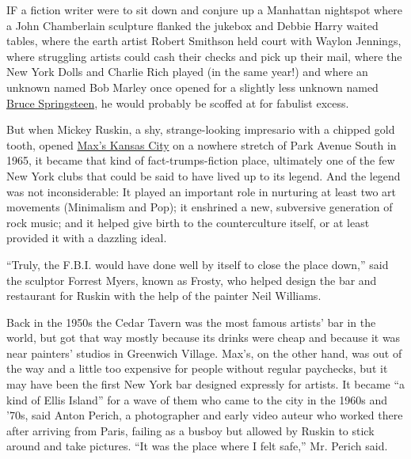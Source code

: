 IF a fiction writer were to sit down and conjure up a Manhattan
nightspot where a John Chamberlain sculpture flanked the jukebox and
Debbie Harry waited tables, where the earth artist Robert Smithson held
court with Waylon Jennings, where struggling artists could cash their
checks and pick up their mail, where the New York Dolls and Charlie Rich
played (in the same year!) and where an unknown named Bob Marley once
opened for a slightly less unknown named
\href{http://www.youtube.com/watch?v=xOQfo3406XE}{Bruce Springsteen}, he
would probably be scoffed at for fabulist excess.

But when Mickey Ruskin, a shy, strange-looking impresario with a chipped
gold tooth, opened
\href{http://classic.maxskansascity.com/index2.php}{Max's Kansas City}
on a nowhere stretch of Park Avenue South in 1965, it became that kind
of fact-trumps-fiction place, ultimately one of the few New York clubs
that could be said to have lived up to its legend. And the legend was
not inconsiderable: It played an important role in nurturing at least
two art movements (Minimalism and Pop); it enshrined a new, subversive
generation of rock music; and it helped give birth to the counterculture
itself, or at least provided it with a dazzling ideal.

``Truly, the F.B.I. would have done well by itself to close the place
down,'' said the sculptor Forrest Myers, known as Frosty, who helped
design the bar and restaurant for Ruskin with the help of the painter
Neil Williams.

Back in the 1950s the Cedar Tavern was the most famous artists' bar in
the world, but got that way mostly because its drinks were cheap and
because it was near painters' studios in Greenwich Village. Max's, on
the other hand, was out of the way and a little too expensive for people
without regular paychecks, but it may have been the first New York bar
designed expressly for artists. It became ``a kind of Ellis Island'' for
a wave of them who came to the city in the 1960s and '70s, said Anton
Perich, a photographer and early video auteur who worked there after
arriving from Paris, failing as a busboy but allowed by Ruskin to stick
around and take pictures. ``It was the place where I felt safe,'' Mr.
Perich said.

